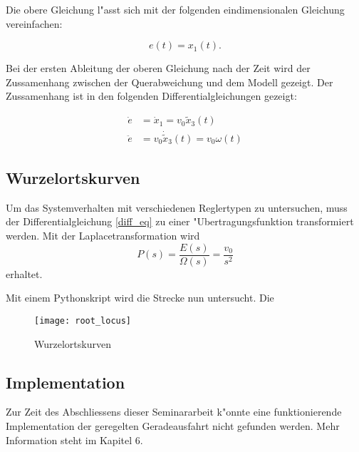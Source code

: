 Die obere Gleichung l"asst sich mit der folgenden eindimensionalen Gleichung vereinfachen:

\begin{equation}
    e(t) = x_1(t).
\end{equation}

Bei der ersten Ableitung der oberen Gleichung nach der Zeit wird der Zussamenhang zwischen der Querabweichung und dem Modell gezeigt. Der Zussamenhang ist in den folgenden Differentialgleichungen gezeigt:

\begin{align}
    \dot{e} &= \dot{x}_1 = v_0\widetilde{x}_3(t) \nonumber \\
    \ddot{e} &= v_0\dot{\widetilde{x}}_3(t) = v_0\omega(t) \label{diff_eq}
\end{align}

\subsection{Wurzelortskurven}    

Um das Systemverhalten mit verschiedenen Reglertypen zu untersuchen, muss der Differentialgleichung \ref{diff_eq} zu einer "Ubertragungsfunktion transformiert werden. Mit der Laplacetransformation wird
\begin{equation}
    P(s) = \frac{E(s)}{\Omega(s)} = \frac{v_0}{s^2}
\end{equation}
erhaltet.

Mit einem Pythonskript wird die Strecke nun untersucht. Die 

\begin{figure}
    \centering
    \texttt{[image: root\_locus]}
    \caption{Wurzelortskurven}
    \label{fig:root_locus}
\end{figure}

\subsection{Implementation}

Zur Zeit des Abschliessens dieser Seminararbeit k"onnte eine funktionierende Implementation der geregelten Geradeausfahrt nicht gefunden werden. Mehr Information steht im Kapitel 6. \\




